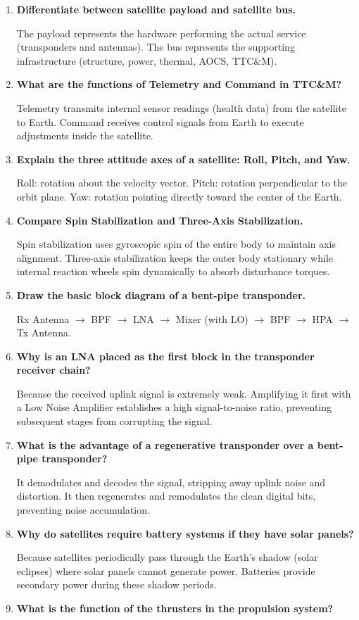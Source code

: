 \documentclass[12pt,a4paper]{article}
\newcommand{\Q}[1]{\textbf{#1}\par\noindent\ignorespaces}
\begin{document}
\begin{tcolorbox}[exambox, title={\textbf{Frequently Asked / Viva Questions}}]
\begin{enumerate}[topsep=0pt, label=\textbf{Q\arabic*.}, itemsep=5pt]
  \item \Q{Differentiate between satellite payload and satellite bus.}
    The payload represents the hardware performing the actual service (transponders and antennas). The bus represents the supporting infrastructure (structure, power, thermal, AOCS, TTC\&M).
  \item \Q{What are the functions of Telemetry and Command in TTC\&M?}
    Telemetry transmits internal sensor readings (health data) from the satellite to Earth. Command receives control signals from Earth to execute adjustments inside the satellite.
  \item \Q{Explain the three attitude axes of a satellite: Roll, Pitch, and Yaw.}
    Roll: rotation about the velocity vector. Pitch: rotation perpendicular to the orbit plane. Yaw: rotation pointing directly toward the center of the Earth.
  \item \Q{Compare Spin Stabilization and Three-Axis Stabilization.}
    Spin stabilization uses gyroscopic spin of the entire body to maintain axis alignment. Three-axis stabilization keeps the outer body stationary while internal reaction wheels spin dynamically to absorb disturbance torques.
  \item \Q{Draw the basic block diagram of a bent-pipe transponder.}
    Rx Antenna $\to$ BPF $\to$ LNA $\to$ Mixer (with LO) $\to$ BPF $\to$ HPA $\to$ Tx Antenna.
  \item \Q{Why is an LNA placed as the first block in the transponder receiver chain?}
    Because the received uplink signal is extremely weak. Amplifying it first with a Low Noise Amplifier establishes a high signal-to-noise ratio, preventing subsequent stages from corrupting the signal.
  \item \Q{What is the advantage of a regenerative transponder over a bent-pipe transponder?}
    It demodulates and decodes the signal, stripping away uplink noise and distortion. It then regenerates and remodulates the clean digital bits, preventing noise accumulation.
  \item \Q{Why do satellites require battery systems if they have solar panels?}
    Because satellites periodically pass through the Earth's shadow (solar eclipses) where solar panels cannot generate power. Batteries provide secondary power during these shadow periods.
  \item \Q{What is the function of the thrusters in the propulsion system?}

\end{enumerate}
\end{tcolorbox}
\end{document}
